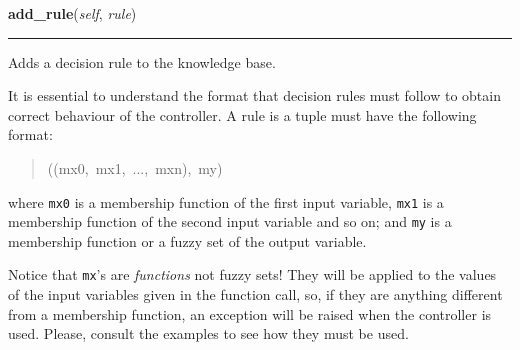 \hspace{.8\funcindent}\begin{boxedminipage}{\funcwidth}

    \raggedright \textbf{add\_rule}(\textit{self}, \textit{rule})

    \vspace{-1.5ex}

    \rule{\textwidth}{0.5\fboxrule}
\setlength{\parskip}{2ex}

Adds a decision rule to the knowledge base.

It is essential to understand the format that decision rules must follow
to obtain correct behaviour of the controller. A rule is a tuple must
have the following format:
%
\begin{quote}{\ttfamily \raggedright \noindent
((mx0,~mx1,~...,~mxn),~my)
}
\end{quote}

where \texttt{mx0} is a membership function of the first input variable,
\texttt{mx1} is a membership function of the second input variable and so on;
and \texttt{my} is a membership function or a fuzzy set of the output
variable.

Notice that \texttt{mx}'s are \emph{functions} not fuzzy sets! They will be
applied to the values of the input variables given in the function call,
so, if they are anything different from a membership function, an
exception will be raised when the controller is used. Please, consult
the examples to see how they must be used.
\setlength{\parskip}{1ex}
    \end{boxedminipage}

    \label{peach:fuzzy:control:Controller:add_table}

    \vspace{0.5ex}

